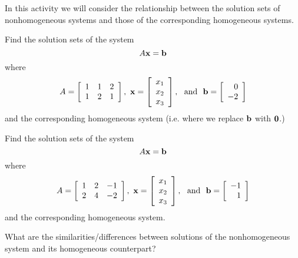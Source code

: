 \begin{activity} In this activity we will consider the relationship between the solution sets of nonhomogeneous systems and those of the corresponding homogeneous systems.

\ba 
\item Find the solution sets of the system
\[A \mathbf{x} = \mathbf{b}\]
where 
\[ A = \left[ \begin{array}{ccc} 1 & 1 & 2  \\ 1 & 2 & 1  \end{array} \right], \ \mathbf{x} = \left[ \begin{array}{c} x_1 \\ x_2 \\ x_3 \end{array} \right], \ \text{ and } \ \mathbf{b} =  \left[ \begin{array}{r} 0 \\ -2 \end{array} \right] \]
and the corresponding homogeneous system (i.e. where we replace $\mathbf{b}$ with $\mathbf{0}$.)


\item Find the solution sets of the system
\[A \mathbf{x} = \mathbf{b}\]
where 
\[A = \left[ \begin{array}{ccr} 1&2&-1 \\ 2&4&-2 \end{array} \right], \ \mathbf{x} =  \left[ \begin{array}{c} x_1 \\ x_2 \\ x_3 \end{array} \right], \ \text{ and } \ \mathbf{b} =  \left[ \begin{array}{r} -1 \\ 1 \end{array} \right]\]
and the corresponding homogeneous system.


\item What are the similarities/differences between solutions of the nonhomogeneous system and its homogeneous counterpart?


\ea
\end{activity}



